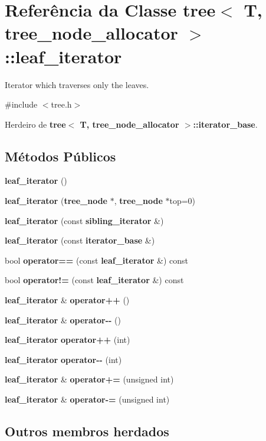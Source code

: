 \section{Referência da Classe tree$<$ T, tree\+\_\+node\+\_\+allocator $>$\+:\+:leaf\+\_\+iterator}
\label{classtree_1_1leaf__iterator}


Iterator which traverses only the leaves.  




{\ttfamily \#include $<$tree.\+h$>$}



Herdeiro de {\bf tree$<$ T, tree\+\_\+node\+\_\+allocator $>$\+::iterator\+\_\+base}.

\subsection*{Métodos Públicos}
\begin{DoxyCompactItemize}
\item 
{\bf leaf\+\_\+iterator} ()
\item 
{\bf leaf\+\_\+iterator} ({\bf tree\+\_\+node} $\ast$, {\bf tree\+\_\+node} $\ast$top=0)
\item 
{\bf leaf\+\_\+iterator} (const {\bf sibling\+\_\+iterator} \&)
\item 
{\bf leaf\+\_\+iterator} (const {\bf iterator\+\_\+base} \&)
\item 
bool {\bf operator==} (const {\bf leaf\+\_\+iterator} \&) const 
\item 
bool {\bf operator!=} (const {\bf leaf\+\_\+iterator} \&) const 
\item 
{\bf leaf\+\_\+iterator} \& {\bf operator++} ()
\item 
{\bf leaf\+\_\+iterator} \& {\bf operator-\/-\/} ()
\item 
{\bf leaf\+\_\+iterator} {\bf operator++} (int)
\item 
{\bf leaf\+\_\+iterator} {\bf operator-\/-\/} (int)
\item 
{\bf leaf\+\_\+iterator} \& {\bf operator+=} (unsigned int)
\item 
{\bf leaf\+\_\+iterator} \& {\bf operator-\/=} (unsigned int)
\end{DoxyCompactItemize}
\subsection*{Outros membros herdados}


